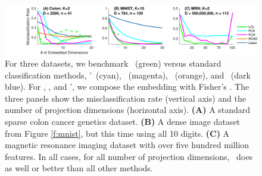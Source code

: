 \documentclass[10pt]{article}
\begin{document}
\begin{figure}[h!]
\centering
\includegraphics[width=1\linewidth]{../Figs/plot_real}
\caption{
For three datasets, we benchmark \Lol~(green) versus standard classification methods, 
\Pca'~(cyan),
\Pca~(magenta),
\Road~(orange), and 
~(dark blue).  For \Lol, \Pca, and \Pca', we compose the embedding with Fisher's \Lda.  
%
The three panels show the misclassification rate (vertical axis) and the number of projection dimensions (horizontal axis).  \textbf{(A)} A standard sparse colon cancer genetics dataset. \textbf{(B)} A dense image dataset from Figure \ref{f:mnist}, but this time using all 10 digits. \textbf{(C)} A magnetic resonance imaging dataset with over five hundred million features.  In all cases, for all number of projection dimensions, \Lol~does as well or better than all other methods.  
%
}
\label{f:realdata}
\end{figure}
\end{document}
